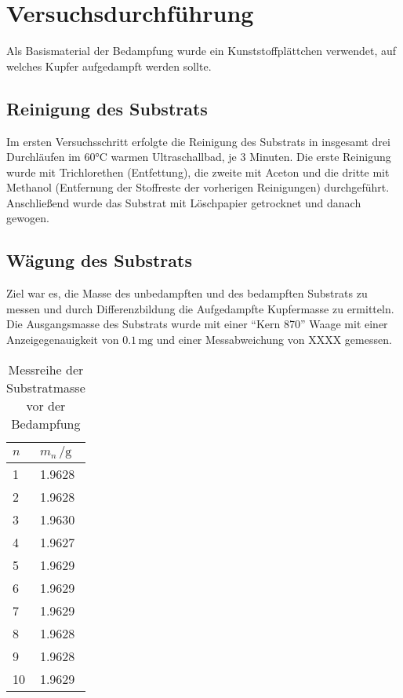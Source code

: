 \documentclass[a4paper, 12pt]{article}
\begin{document}
  
  \clearpage
  \setcounter{page}{1}

\section{Versuchsdurchführung}

Als Basismaterial der Bedampfung wurde ein Kunststoffplättchen verwendet, auf welches Kupfer aufgedampft werden sollte.

\subsection{Reinigung des Substrats}
Im ersten Versuchsschritt erfolgte die Reinigung des Substrats in
insgesamt drei Durchläufen im $60\si{\celsius}$ warmen Ultraschallbad, je 3
Minuten. Die erste Reinigung wurde mit Trichlorethen (Entfettung), die
zweite mit Aceton und die dritte mit Methanol (Entfernung der Stoffreste der
vorherigen Reinigungen) durchgeführt. Anschließend wurde das Substrat mit
Löschpapier getrocknet und danach gewogen.

\subsection{Wägung des Substrats}
Ziel war es, die Masse des unbedampften und des bedampften Substrats zu messen und durch Differenzbildung die Aufgedampfte Kupfermasse zu ermitteln. Die Ausgangsmasse des Substrats wurde
mit einer ``Kern 870'' Waage mit einer Anzeigegenauigkeit von $0.1 \,  \si{\milli\gram}$
und einer Messabweichung von XXXX gemessen.
\begin{table}[H]
  \begin{center}
    \begin{tabular}{@{}ll@{}}
      \toprule
      $n$ & $m_n \, / \si{\gram}$ \\ \midrule
      1  & 1.9628 \\
      2  & 1.9628 \\
      3  & 1.9630 \\
      4  & 1.9627 \\
      5  & 1.9629 \\
      6  & 1.9629 \\
      7  & 1.9629 \\
      8  & 1.9628 \\
      9  & 1.9628 \\
      10 & 1.9629 \\ \bottomrule
    \end{tabular}
  \end{center}
  \caption{Messreihe der Substratmasse vor der Bedampfung}
\end{table}
\end{document}
